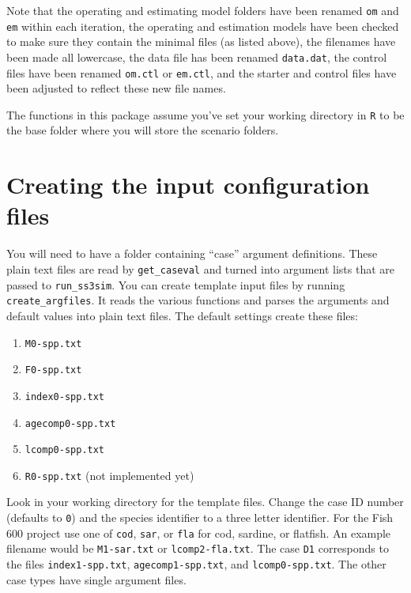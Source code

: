 \documentclass[12pt]{article}
\begin{document}
\noindent
Note that the operating and estimating model folders have been renamed
\texttt{om} and \texttt{em} within each iteration, the operating and estimation 
models have been checked to make sure they contain the minimal files (as listed 
above), the filenames have been made all lowercase, the data file has been 
renamed \texttt{data.dat}, the control files have been renamed \texttt{om.ctl} 
or \texttt{em.ctl}, and the starter and control files have been adjusted to 
reflect these new file names.

The functions in this package assume you've set your working directory in 
\texttt{R} to be the base folder where you will store the scenario folders.

\section{Creating the input configuration files}
You will need to have a folder containing ``case'' argument definitions. These 
plain text files are read by \texttt{get\_caseval} and turned into argument 
lists that are passed to \texttt{run\_ss3sim}. You can create template input 
files by running \texttt{create\_argfiles}. It reads the various functions and 
parses the arguments and default values into plain text files. The default 
settings create these files:

\begin{enumerate}
  \item \texttt{M0-spp.txt}
  \item \texttt{F0-spp.txt}
  \item \texttt{index0-spp.txt}
  \item \texttt{agecomp0-spp.txt}
  \item \texttt{lcomp0-spp.txt}
  \item \texttt{R0-spp.txt} (not implemented yet)
\end{enumerate}

Look in your working directory for the template files. Change the case ID 
number (defaults to \texttt{0}) and the species identifier to a three letter 
identifier. For the Fish 600 project use one of \texttt{cod}, \texttt{sar}, or 
\texttt{fla} for cod, sardine, or flatfish. An example filename would be 
\texttt{M1-sar.txt} or \texttt{lcomp2-fla.txt}. The case \texttt{D1} 
corresponds to the files \texttt{index1-spp.txt}, \texttt{agecomp1-spp.txt}, 
and \texttt{lcomp0-spp.txt}. The other case types have single argument files.
\end{document}
